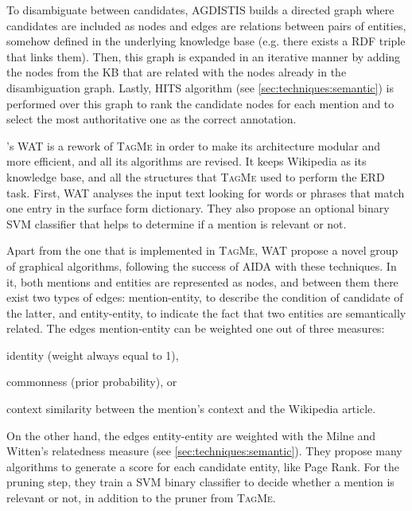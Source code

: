 To disambiguate between candidates, AGDISTIS builds a directed graph where candidates are included as nodes and edges are relations between pairs of entities, somehow defined in the underlying knowledge base (e.g. there exists a RDF triple that links them). Then, this graph is expanded in an iterative manner by adding the nodes from the KB that are related with the nodes already in the disambiguation graph. Lastly, HITS algorithm (see \autoref{sec:techniques:semantic}) is performed over this graph to rank the candidate nodes for each mention and to select the most authoritative one as the correct annotation.

\medskip

\cite{piccinno2014}'s WAT is a rework of \textsc{TagMe} in order to make its architecture modular and more efficient, and all its algorithms are revised. It keeps Wikipedia as its knowledge base, and all the structures that \textsc{TagMe} used to perform the ERD task. First, WAT analyses the input text looking for words or phrases that match one entry in the surface form dictionary. They also propose an optional binary SVM classifier that helps to determine if a mention is relevant or not.

Apart from the one that is implemented in \textsc{TagMe}, WAT propose a novel group of graphical algorithms, following the success of AIDA with these techniques. In it, both mentions and entities are represented as nodes, and between them there exist two types of edges: mention-entity, to describe the condition of candidate of the latter, and entity-entity, to indicate the fact that two entities are semantically related. The edges mention-entity can be weighted one out of three measures:
%
\begin{enumerate*}
	\item identity (weight always equal to 1),
	\item commonness (prior probability), or
	\item context similarity between the mention's context and the Wikipedia article.
\end{enumerate*} 
%
On the other hand, the edges entity-entity are weighted with the Milne and Witten's relatedness measure (see \autoref{sec:techniques:semantic}). They propose many algorithms to generate a score for each candidate entity, like Page Rank. For the pruning step, they train a SVM binary classifier to decide whether a mention is relevant or not, in addition to the pruner from \textsc{TagMe}.

\medskip

